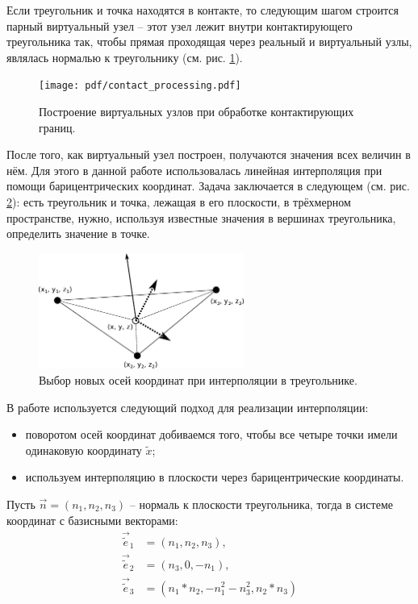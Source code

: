 Если треугольник и точка находятся в контакте, то следующим шагом строится парный виртуальный узел -- этот узел лежит внутри контактирующего треугольника так, чтобы прямая проходящая через реальный и виртуальный узлы, являлась нормалью к треугольнику (см. рис. \ref{pic:contact_processing}).
\begin{figure}[htp]
\centering
\texttt{[image: pdf/contact\_processing.pdf]}
\caption{Построение виртуальных узлов при обработке контактирующих границ.}
\label{pic:contact_processing}
\end{figure}
После того, как виртуальный узел построен, получаются значения всех величин в нём. Для этого в данной работе использовалась линейная интерполяция при помощи барицентрических координат. Задача заключается в следующем (см. рис. \ref{pic:triangle_interpolation}): есть треугольник и точка, лежащая в его плоскости, в трёхмерном пространстве, нужно, используя известные значения в вершинах треугольника, определить значение в точке.
\begin{figure}[htp]
\centering
\includegraphics[width=0.6\textwidth]{eps/triangle_interpolation.eps}
\caption{Выбор новых осей координат при интерполяции в треугольнике.}
\label{pic:triangle_interpolation}
\end{figure}
В работе используется следующий подход для реализации интерполяции:
\begin{itemize}
	\item поворотом осей координат добиваемся того, чтобы все четыре точки имели одинаковую координату $\tilde{x}$;
	\item используем интерполяцию в плоскости через барицентрические координаты.
\end{itemize}
Пусть $\vec{n}=(n_1,n_2,n_3)$ -- нормаль к плоскости треугольника, тогда в системе координат с базисными векторами:
\begin{align}
\label{eq:new_coords}
\vec{\tilde{e}}_1&=(n_1, n_2, n_3), \nonumber \\
\vec{\tilde{e}}_2&=(n_3, 0, -n_1), \nonumber \\
\vec{\tilde{e}}_3&=(n_1*n_2, -n_1^2-n_3^2, n_2*n_3)
\end{align}
